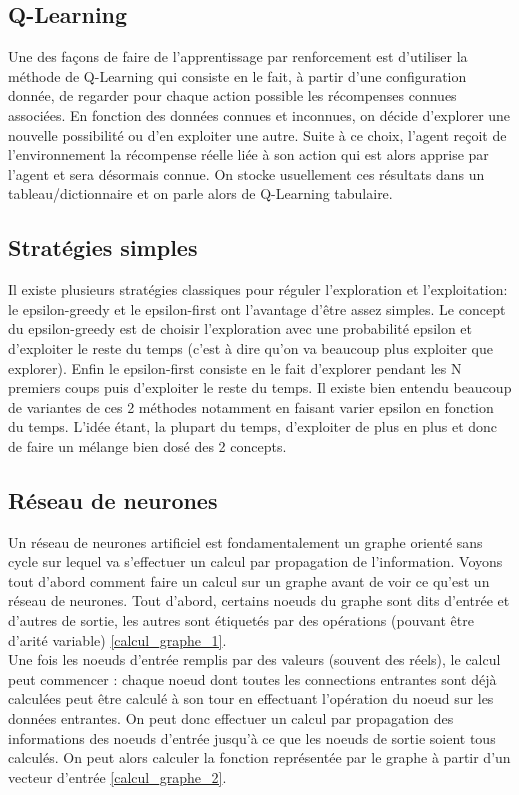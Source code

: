 \documentclass[10pt]{article}
\begin{document}
\subsection{Q-Learning}
Une des façons de faire de l'apprentissage par renforcement est d'utiliser la méthode de Q-Learning qui consiste en le fait, à partir d'une configuration donnée, de regarder pour chaque action possible les récompenses connues associées. En fonction des données connues et inconnues, on décide d'explorer une nouvelle possibilité ou d'en exploiter une autre. Suite à ce choix, l'agent reçoit de l'environnement la récompense réelle liée à son action qui est alors apprise par l'agent et sera désormais connue. On stocke usuellement ces résultats dans un tableau/dictionnaire et on parle alors de Q-Learning tabulaire.
\subsection{Stratégies simples}
Il existe plusieurs stratégies classiques pour réguler l'exploration et l'exploitation: le epsilon-greedy et le epsilon-first ont l'avantage d'être assez simples. Le concept du epsilon-greedy est de choisir l'exploration avec une probabilité epsilon et d'exploiter le reste du temps (c'est à dire qu'on va beaucoup plus exploiter que explorer). Enfin le epsilon-first consiste en le fait d'explorer pendant les N premiers coups puis d'exploiter le reste du temps. Il existe bien entendu beaucoup de variantes de ces 2 méthodes notamment en faisant varier epsilon en fonction du temps. L'idée étant, la plupart du temps, d'exploiter de plus en plus et donc de faire un mélange bien dosé des 2 concepts.
\subsection{Réseau de neurones}
Un réseau de neurones artificiel est fondamentalement un graphe orienté sans cycle sur lequel va s'effectuer un calcul par propagation de l'information. Voyons tout d'abord comment faire un calcul sur un graphe avant de voir ce qu'est un réseau de neurones. Tout d'abord, certains noeuds du graphe sont dits d'entrée et d'autres de sortie, les autres sont étiquetés par des opérations (pouvant être d'arité variable) \ref{calcul_graphe_1}. \\
Une fois les noeuds d'entrée remplis par des valeurs (souvent des réels), le calcul peut commencer : chaque noeud dont toutes les connections entrantes sont déjà calculées peut être calculé à son tour en effectuant l'opération du noeud sur les données entrantes. On peut donc effectuer un calcul par propagation des informations des noeuds d'entrée jusqu'à ce que les noeuds de sortie soient tous calculés. On peut alors calculer la fonction représentée par le graphe à partir d'un vecteur d'entrée \ref{calcul_graphe_2}.\\\\
\end{document}
